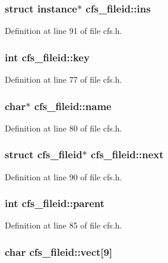 \subsubsection{\setlength{\rightskip}{0pt plus 5cm}struct {\bf instance}$\ast$ {\bf cfs\_\-fileid::ins}}\label{structcfs__fileid_o8}




Definition at line 91 of file cfs.h.
\subsubsection{\setlength{\rightskip}{0pt plus 5cm}int {\bf cfs\_\-fileid::key}}\label{structcfs__fileid_o1}




Definition at line 77 of file cfs.h.
\subsubsection{\setlength{\rightskip}{0pt plus 5cm}char$\ast$ {\bf cfs\_\-fileid::name}}\label{structcfs__fileid_o4}




Definition at line 80 of file cfs.h.
\subsubsection{\setlength{\rightskip}{0pt plus 5cm}struct {\bf cfs\_\-fileid}$\ast$ {\bf cfs\_\-fileid::next}}\label{structcfs__fileid_o7}




Definition at line 90 of file cfs.h.
\subsubsection{\setlength{\rightskip}{0pt plus 5cm}int {\bf cfs\_\-fileid::parent}}\label{structcfs__fileid_o6}




Definition at line 85 of file cfs.h.
\subsubsection{\setlength{\rightskip}{0pt plus 5cm}char {\bf cfs\_\-fileid::vect}[9]}\label{structcfs__fileid_o2}




